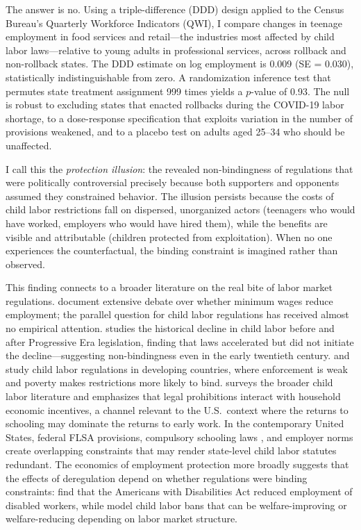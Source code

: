 \documentclass[12pt]{article}
\begin{document}
The answer is no. Using a triple-difference (DDD) design applied to the Census Bureau's Quarterly Workforce Indicators (QWI), I compare changes in teenage employment in food services and retail---the industries most affected by child labor laws---relative to young adults in professional services, across rollback and non-rollback states. The DDD estimate on log employment is 0.009 (SE = 0.030), statistically indistinguishable from zero. A randomization inference test that permutes state treatment assignment 999 times yields a $p$-value of 0.93. The null is robust to excluding states that enacted rollbacks during the COVID-19 labor shortage, to a dose-response specification that exploits variation in the number of provisions weakened, and to a placebo test on adults aged 25--34 who should be unaffected.

I call this the \textit{protection illusion}: the revealed non-bindingness of regulations that were politically controversial precisely because both supporters and opponents assumed they constrained behavior. The illusion persists because the costs of child labor restrictions fall on dispersed, unorganized actors (teenagers who would have worked, employers who would have hired them), while the benefits are visible and attributable (children protected from exploitation). When no one experiences the counterfactual, the binding constraint is imagined rather than observed.

This finding connects to a broader literature on the real bite of labor market regulations. \citet{neumark_wascher2007} document extensive debate over whether minimum wages reduce employment; the parallel question for child labor regulations has received almost no empirical attention. \citet{moehling1999} studies the historical decline in child labor before and after Progressive Era legislation, finding that laws accelerated but did not initiate the decline---suggesting non-bindingness even in the early twentieth century. \citet{manacorda2006} and \citet{edmonds_pavcnik2005} study child labor regulations in developing countries, where enforcement is weak and poverty makes restrictions more likely to bind. \citet{edmonds2008} surveys the broader child labor literature and emphasizes that legal prohibitions interact with household economic incentives, a channel relevant to the U.S.\ context where the returns to schooling may dominate the returns to early work. In the contemporary United States, federal FLSA provisions, compulsory schooling laws \citep{lleras_muney2002, oreopolous2006}, and employer norms create overlapping constraints that may render state-level child labor statutes redundant. The economics of employment protection more broadly suggests that the effects of deregulation depend on whether regulations were binding constraints: \citet{acemoglu_angrist2001} find that the Americans with Disabilities Act reduced employment of disabled workers, while \citet{basu_van1998} model child labor bans that can be welfare-improving or welfare-reducing depending on labor market structure.
\end{document}
